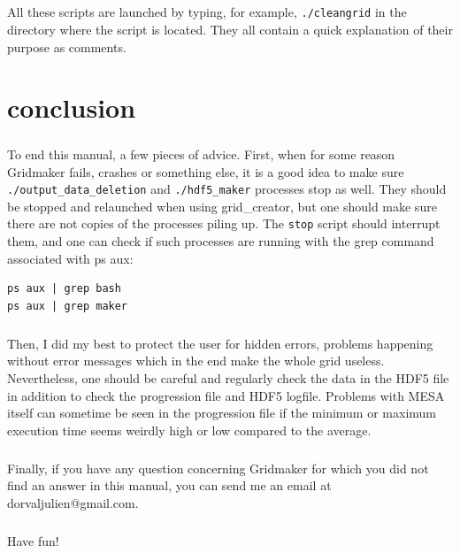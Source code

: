 \documentclass{report}
\begin{document}
\paragraph{}All these scripts are launched by typing, for example, \verb+./cleangrid+ in the directory where the script is located. They all contain a quick explanation of their purpose as comments.

\chapter{conclusion}

\paragraph{}To end this manual, a few pieces of advice. First, when for some reason Gridmaker fails, crashes or something else, it is a good idea to make sure \verb+./output_data_deletion+ and \verb+./hdf5_maker+ processes stop as well. They should be stopped and relaunched when using grid\_creator, but one should make sure there are not copies of the processes piling up. The \verb+stop+ script should interrupt them, and one can check if such processes are running with the grep command associated with ps aux:
\begin{verbatim}
ps aux | grep bash
ps aux | grep maker
\end{verbatim}

\paragraph{}Then, I did my best to protect the user for hidden errors, problems happening without error messages which in the end make the whole grid useless. Nevertheless, one should be careful and regularly check the data in the HDF5 file in addition to check the progression file and HDF5 logfile. Problems with MESA itself can sometime be seen in the progression file if the minimum or maximum execution time seems weirdly high or low compared to the average.

\paragraph{}Finally, if you have any question concerning Gridmaker for which you did not find an answer in this manual, you can send me an email at dorvaljulien@gmail.com.

\paragraph{}Have fun!
\end{document}
